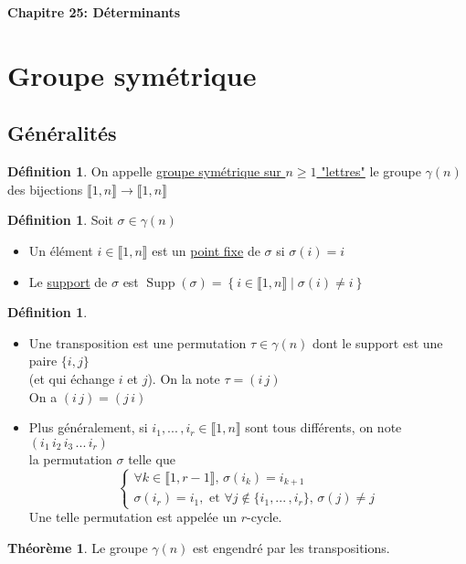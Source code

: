 \documentclass[10pt,a4paper]{article}
\theoremstyle{definition}
\newtheorem{theorem}[proposition]{Théorème}
\newtheorem{definition}[proposition]{Définition}
\DeclareMathOperator{\supp}{Supp}
\begin{document}
\renewcommand{\labelitemi}{$*$}
\begin{center}
{\Large \textbf{Chapitre 25: Déterminants}}
\end{center}

\section{Groupe symétrique}
\subsection{Généralités}
\begin{definition}
On appelle \uline{groupe symétrique sur $n \geq 1$ "lettres"} le groupe $\gamma(n)$ des bijections $\llbracket 1, n \rrbracket \to \llbracket 1, n \rrbracket$
\end{definition}
\begin{definition}
Soit $\sigma \in \gamma(n)$
\begin{itemize}
\item Un élément $i \in \llbracket 1, n \rrbracket$ est un \uline{point fixe} de $\sigma$ si $\sigma(i) = i$
\item Le \uline{support} de $\sigma$ est $\supp(\sigma) = \left\{ i \in \llbracket 1, n \rrbracket \mid \sigma(i) \neq i \right\}$
\end{itemize}
\end{definition}
\begin{definition}
\hfill
\begin{itemize}
\item Une transposition est une permutation $\tau \in \gamma(n)$ dont le support est une paire $\{ i, j \}$ \\
(et qui échange $i$ et $j$). On la note $\tau = (i \, j)$ \\
On a $(i \, j) = (j \, i)$
\item Plus généralement, si $i_1, ...\, , i_r \in \llbracket 1, n \rrbracket$ sont tous différents, on note $(i_1 \, i_2 \, i_3 \, ... \, i_r)$ \\
la permutation $\sigma$ telle que
\[\begin{cases}
\forall k \in \llbracket 1, r - 1 \rrbracket,\, \sigma(i_k) = i_{k + 1} \\
\sigma(i_r) = i_1, \text{ et } \forall j \notin \{ i_1, ...\, , i_r\},\, \sigma(j) \neq j
\end{cases}\]
Une telle permutation est appelée un $r$-cycle.
\end{itemize}
\end{definition}
\begin{theorem}
Le groupe $\gamma(n)$ est engendré par les transpositions.
\end{theorem}
\end{document}
